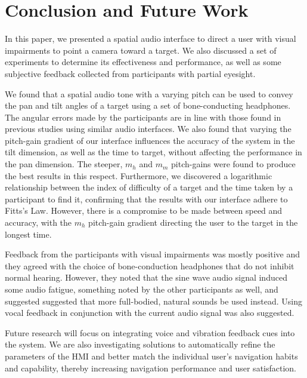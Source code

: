 \documentclass[sigconf, screen=true, anonymous=true]{acmart}
\begin{document}
\section{Conclusion and Future Work}\label{sec:conclusion}

In this paper, we presented a spatial audio interface to direct a user with visual impairments to point a camera toward a target. We also discussed a set of experiments to determine its effectiveness and performance, as well as some subjective feedback collected from participants with partial eyesight. 

We found that a spatial audio tone with a varying pitch can be used to convey the pan and tilt angles of a target using a set of bone-conducting headphones.
The angular errors made by the participants are in line with those found in previous studies using similar audio interfaces.
We also found that varying the pitch-gain gradient of our interface influences the accuracy of the system in the tilt dimension, as well as the time to target, without affecting the performance in the pan dimension.
The steeper, $m_h$ and $m_m$ pitch-gains were found to produce the best results in this respect.
Furthermore, we discovered a logarithmic relationship between the index of difficulty of a target and the time taken by a participant to find it, confirming that the results with our interface adhere to Fitts's Law.
However, there is a compromise to be made between speed and accuracy, with the $m_h$ pitch-gain gradient directing the user to the target in the longest time. 

Feedback from the participants with visual impairments was mostly positive and they agreed with the choice of bone-conduction headphones that do not inhibit normal hearing.
However, they noted that the sine wave audio signal induced some audio fatigue, something noted by the other participants as well, and suggested suggested that more full-bodied, natural sounds be used instead.
Using vocal feedback in conjunction with the current audio signal was also suggested. 

Future research will focus on integrating voice and vibration feedback cues into the system.
We are also investigating solutions to automatically refine the parameters of the HMI and better match the individual user's navigation habits and capability, thereby increasing navigation performance and user satisfaction.


%
\end{document}
